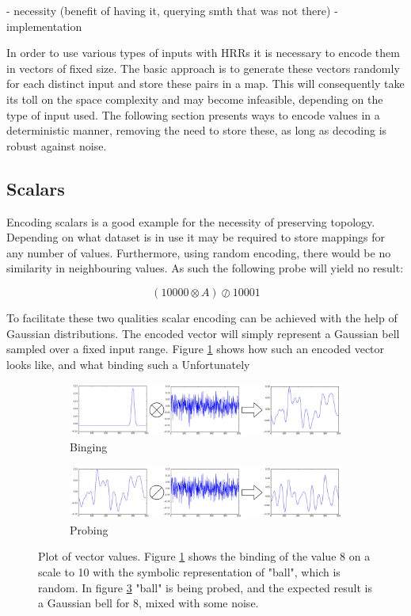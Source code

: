 \documentclass[conference]{IEEEtran}
\begin{document}
- necessity (benefit of having it, querying smth that was not there)
- implementation

In order to use various types of inputs with HRRs it is necessary to encode them in vectors of fixed size. The basic approach is to generate these vectors randomly for each distinct input and store these pairs in a map. This will consequently take its toll on the space complexity and may become infeasible, depending on the type of input used. The following section presents ways to encode values in a deterministic manner, removing the need to store these, as long as decoding is robust against noise. 

\subsection{Scalars}

Encoding scalars is a good example for the necessity of preserving topology. Depending on what dataset is in use it may be required to store mappings for any number of values. Furthermore, using random encoding, there would be no similarity in neighbouring values. As such the following probe will yield no result:

\begin{equation}
(10000 \otimes A) \oslash 10001
\end{equation}

To facilitate these two qualities scalar encoding can be achieved with the help of Gaussian distributions. The encoded vector will simply represent a Gaussian bell sampled over a fixed input range. Figure \ref{no-perm-a} shows how such an encoded vector looks like, and what binding such a  Unfortunately

\begin{figure}
\begin{subfigure}{1\columnwidth}
\includegraphics[width=\columnwidth]{img/scalar-pre-perm.png}
\caption{Binging}
\label{no-perm-a}
\end{subfigure}
\begin{subfigure}{1\columnwidth}
\includegraphics[width=\columnwidth]{img/scalar-pre-perm-probe.png}
\caption{Probing}
\label{no-perm-b}
\end{subfigure}
\caption{Plot of vector values. Figure \ref{no-perm-a} shows the binding of the value 8 on a scale to 10 with the symbolic representation of "ball", which is random. In figure \ref{no-perm-b} "ball" is being probed, and the expected result is a Gaussian bell for 8, mixed with some noise.}
\end{figure}
\end{document}
